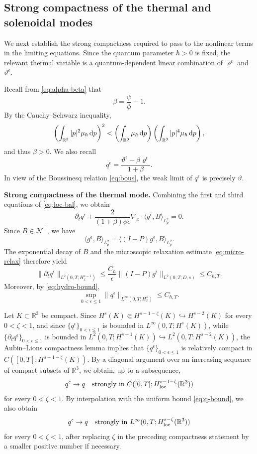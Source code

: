 \documentclass[10pt,reqno]{amsart}
\numberwithin{equation}{section}
\newcommand{\lt}{\left}
\newcommand{\rt}{\right}
\newcommand{\lal}{\langle}
\newcommand{\ral}{\rangle}
\newcommand{\mR}{\mathbb{R}}
\newcommand{\vrh}{\varrho}
\newcommand{\vth}{\vartheta}
\newcommand{\intr}{\int_{\mR^3}}
\newcommand{\R}{\mathbb R}
\newcommand{\bq}{\begin{equation}}
\newcommand{\eq}{\end{equation}}
\newcommand{\pa}{\partial}
\newcommand{\calN}{\mathcal N}
\newcommand{\rdp}{\textnormal{d}p}
\begin{document}
\subsection{Strong compactness of the thermal and solenoidal modes}

We next establish the strong compactness required to pass to the nonlinear terms in the limiting equations. Since the quantum parameter $\hbar>0$ is fixed, the relevant thermal variable is a quantum-dependent linear combination of $\vrh^\epsilon$ and $\vth^\epsilon$.

Recall from \eqref{eq:alpha-beta} that
\[
\beta =\frac{\psi }{\phi }-1.
\]
By the Cauchy--Schwarz inequality,
\[
\lt(\intr |p|^2\mu_\hbar\,\rdp\rt)^2<\lt(\intr \mu_\hbar\,\rdp\rt)\lt(\intr |p|^4\mu_\hbar\,\rdp\rt),
\]
and thus $\beta >0$. We also recall
\[
q^\epsilon=\frac{\vth^\epsilon-\beta \vrh^\epsilon}{1+\beta }.
\]
In view of the Boussinesq relation \eqref{eq:bous}, the weak limit of $q^\epsilon$ is precisely $\vth$.



\medskip
\noindent
\textbf{Strong compactness of the thermal mode.}
Combining the first and third equations of \eqref{eq:loc-bal}, we obtain
\bq\label{eq:q-eq}
\pa_t q^\epsilon+\frac{2}{(1+\beta )\phi \epsilon}\nabla_x\cdot\lal g^\epsilon,B \ral_{L^2_p}=0.
\eq
Since $B \in\calN^\perp$, we have
\[
\lal g^\epsilon,B \ral_{L^2_p}=\lal(I-P)g^\epsilon,B \ral_{L^2_p}.
\]
The exponential decay of $B $ and the microscopic relaxation estimate \eqref{eq:micro-relax} therefore yield
\[
\|\pa_t q^\epsilon\|_{L^2(0,T;H^{s-1}_x)}\le\frac{C_\hbar}{\epsilon}\|(I-P)g^\epsilon\|_{L^2(0,T;D,s)}\le C_{\hbar,T}.
\]
Moreover, by \eqref{eq:hydro-bound},
\bq\label{eq:q-bound}
\sup_{0<\epsilon\le1}\|q^\epsilon\|_{L^\infty(0,T;H^s_x)}\le C_{\hbar,T}.
\eq

Let $K\subset\R^3$ be compact. Since $H^s(K)\Subset H^{s-1-\zeta}(K)\hookrightarrow H^{s-2}(K)$ for every $0<\zeta<1$, and since $\{q^\epsilon\}_{0<\epsilon\le1}$ is bounded in $L^\infty(0,T;H^s(K))$, while $\{\pa_t q^\epsilon\}_{0<\epsilon\le1}$ is bounded in $L^2(0,T;H^{s-1}(K)) \hookrightarrow L^2(0,T;H^{s-2}(K))$, the Aubin--Lions compactness lemma implies that $\{q^\epsilon\}_{0<\epsilon\le1}$ is relatively compact in $C([0,T];H^{s-1-\zeta}(K))$. By a diagonal argument over an increasing sequence of compact subsets of
$\R^3$, we obtain, up to a subsequence,
\[
q^\epsilon\to q \quad\text{strongly in } C([0,T];H^{s-1-\zeta}_{\rm loc}(\R^3))
\]
for every $0<\zeta<1$. By interpolation with the uniform bound \eqref{eq:q-bound}, we also obtain
\[
q^\epsilon\to q \quad\text{strongly in } L^\infty(0,T;H^{s-\zeta}_{\rm loc}(\R^3))
\]
for every $0<\zeta<1$, after replacing $\zeta$ in the preceding compactness statement by a smaller positive number if necessary.
 
\end{document}
